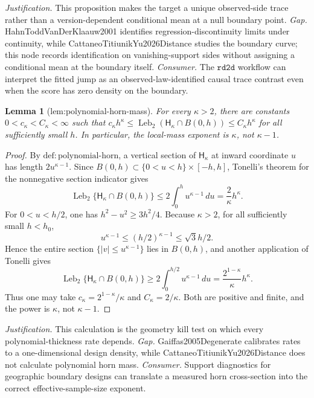 \documentclass{article}
\newtheorem{lemma}{Lemma}
\begin{document}
\par\smallskip\noindent \textit{Justification.} This proposition makes the target a unique observed-side trace rather than a version-dependent conditional mean at a null boundary point. \textit{Gap.} HahnToddVanDerKlaauw2001 identifies regression-discontinuity limits under continuity, while CattaneoTitiunikYu2026Distance studies the boundary curve; this node records identification on vanishing-support sides without assigning a conditional mean at the boundary itself. \textit{Consumer.} The \(\texttt{rd2d}\) workflow can interpret the fitted jump as an observed-law-identified causal trace contrast even when the score has zero density on the boundary.

\begin{lemma}[lem:polynomial-horn-mass]\label{lem:polynomial-horn-mass}
For every \(\kappa>2\), there are constants \(0<c_\kappa<C_\kappa<\infty\) such that \(c_\kappa h^{\kappa}\le\operatorname{Leb}_2(\mathsf H_{\kappa}\cap B(0,h))\le C_\kappa h^{\kappa}\) for all sufficiently small \(h\). In particular, the local-mass exponent is \(\kappa\), not \(\kappa-1\).
\end{lemma}
\begin{proof}
By \(\mathrm{def:polynomial\text{-}horn}\), a vertical section of \(\mathsf H_{\kappa}\) at inward coordinate \(u\) has length \(2u^{\kappa-1}\). Since \(B(0,h)\subset\{0<u<h\}\times[-h,h]\), Tonelli's theorem for the nonnegative section indicator gives
\[
 \operatorname{Leb}_2\{\mathsf H_{\kappa}\cap B(0,h)\}
 \le 2\int_0^h u^{\kappa-1}\,du
 =\frac{2}{\kappa}h^{\kappa}.
\]
For \(0<u<h/2\), one has \(h^2-u^2\ge3h^2/4\). Because \(\kappa>2\), for all sufficiently small \(h<h_0\),
\[
 u^{\kappa-1}\le(h/2)^{\kappa-1}\le \sqrt{3}h/2.
\]
Hence the entire section \(\{|v|\le u^{\kappa-1}\}\) lies in \(B(0,h)\), and another application of Tonelli gives
\[
 \operatorname{Leb}_2\{\mathsf H_{\kappa}\cap B(0,h)\}
 \ge 2\int_0^{h/2}u^{\kappa-1}\,du
 =\frac{2^{1-\kappa}}{\kappa}h^{\kappa}.
\]
Thus one may take \(c_{\kappa}=2^{1-\kappa}/\kappa\) and \(C_{\kappa}=2/\kappa\). Both are positive and finite, and the power is \(\kappa\), not \(\kappa-1\).
\end{proof}
\par\smallskip\noindent \textit{Justification.} This calculation is the geometry kill test on which every polynomial-thickness rate depends. \textit{Gap.} Gaiffas2005Degenerate calibrates rates to a one-dimensional design density, while CattaneoTitiunikYu2026Distance does not calculate polynomial horn mass. \textit{Consumer.} Support diagnostics for geographic boundary designs can translate a measured horn cross-section into the correct effective-sample-size exponent.
\end{document}
